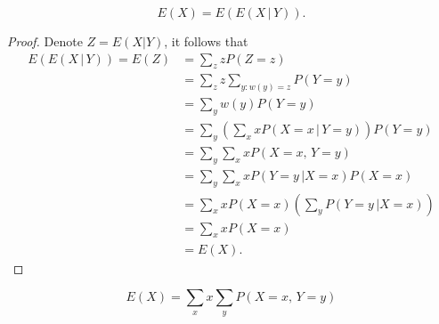 \begin{lemma} \label{lem:EXY}
\begin{equation}\label{e:eee}
E(X) = E(E(X\, | \, Y)).
\end{equation}
\end{lemma}
\begin{proof}
Denote $Z=E(X|Y)$, it follows that
\begin{align}
E(E(X \, | \, Y))  = E(Z)
&=\sum_z zP(Z=z)\\
&= \sum_zz\sum_{y: w(y)=z}P( Y=y )  \\
&= \sum_y w(y) P( Y = y )  \\
 &  = \sum_y \left(  \sum_x x P(X = x \, | \, Y=y)  \right) P(Y = y) \\
			           & = \sum_y \sum_x x P(X= x, \, Y = y) \\
			           & = \sum_y \sum_x x P(Y= y \, | X = x) P(X = x) \\
			           & = \sum_x x P(X = x) \left( \sum_y P(Y = y\, | X = x) \right) \\
			           & = \sum_x x P(X = x) \\
			           & = E(X).
\end{align}
\end{proof}

\begin{lemma}
\begin{equation}
E(X) = \sum_xx\sum_y P(X= x, \, Y = y)
\end{equation}
\end{lemma}

